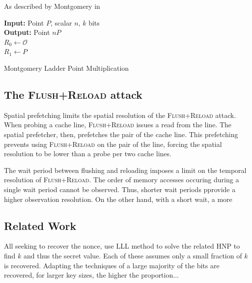 \documentclass{llncs}
\begin{document}
As described by Montgomery in \cite{montgomery87speeding}

\begin{algorithm}[htb]
 \SetAlgoLined
{\bf Input:} Point $P$, scalar $n$, $k$ bits\\
{\bf Output:} Point $nP$\\
$R_0\gets \mathcal{O}$\\
$R_1\gets P$\\
 \caption{Montgomery Ladder Point Multiplication}
\end{algorithm}

\subsection{The \textsc{Flush+Reload} attack}

Spatial prefetching limits the spatial resolution of the \textsc{Flush+Reload} attack.
When probing a cache line, \textsc{Flush+Reload} issues a read from the line.  
The spatial prefetcher, then, prefetches the pair of the cache line. 
This prefetching prevents using \textsc{Flush+Reload} on the pair of the line,
forcing the spatial resolution to be lower than a probe per two cache lines.

The wait period between flushing and reloading imposes a limit on the temporal resolution of \textsc{Flush+Reload}.
The order of memory accesses occuring during a single wait period cannot be observed.
Thus, shorter wait periods pprovide a higher observation resolution.
On the other hand, with a short wait, a more 

\subsection{Related Work}\label{sec:related}
\cite{Howgrave-GrahamS01}
\cite{gopalakrishnan07solving}
\cite{nguyen03insecurity}

All seeking to recover the nonce, use LLL method to solve the related HNP to find $k$ and thus the secret value. Each of these assumes only a small fraction of $k$ is recovered. Adapting the techniques of \cite{yarom13flush} a large majority of the bits are recovered, for larger key sizes, the higher the proportion...
\end{document}
